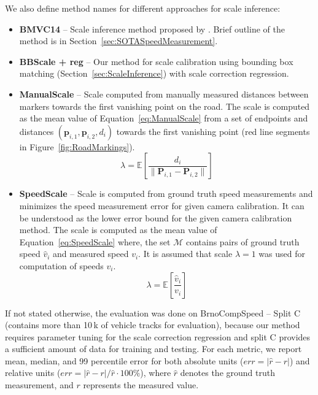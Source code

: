 \documentclass[]{elsarticle}
\newcommand{\gt}[1]{\hat{#1}}
\newcommand{\BMVCScale}{BMVC14}
\newcommand{\BBScaleReg}{BBScale + reg}
\newcommand{\ManualScale}{ManualScale}
\newcommand{\SpeedScale}{SpeedScale}
\begin{document}
We also define method names for different approaches for scale inference:
\begin{itemize}
	\item \textbf{\BMVCScale} -- Scale inference method proposed by \cite{Dubska2014}. Brief outline of the method is in Section~\ref{sec:SOTASpeedMeasurement}.
	\item \textbf{\BBScaleReg} -- Our method for scale calibration using bounding box matching (Section~\ref{sec:ScaleInference}) with scale correction regression.
	\item \textbf{\ManualScale} -- Scale computed from manually measured distances between markers towards the first vanishing point on the road. The scale is computed as the mean value of Equation~\eqref{eq:ManualScale} from a set of endpoints and distances $(\mathbf{p}_{i,1}, \mathbf{p}_{i,2}, d_i)$ towards the first vanishing point (red line segments in Figure~\ref{fig:RoadMarkings}). 
	\begin{equation}
		\lambda = \mathbb{E}\left[ \frac{d_i}{\| \mathbf{P}_{i,1} - \mathbf{P}_{i,2} \|} \right] \label{eq:ManualScale}
	\end{equation}

	\item \textbf{\SpeedScale} -- Scale is computed from ground truth speed measurements and minimizes the speed measurement error for given camera calibration. It can be understood as the lower error bound for the given camera calibration method. The scale is computed as the mean value of Equation~\eqref{eq:SpeedScale} where, the set $\mathcal{M}$ contains pairs of ground truth speed $\gt{v}_i$ and measured speed $v_i$. It is assumed that scale $\lambda = 1$ was used for computation of speeds $v_i$.
	\begin{equation}
	\lambda =  \mathbb{E} \left[ \frac{\gt{v}_i}{v_i} \right] \label{eq:SpeedScale}
	\end{equation}
\end{itemize}

If not stated otherwise, the evaluation was done on BrnoCompSpeed -- Split C (contains more than 10\,k of vehicle tracks for evaluation), because our method requires parameter tuning for the scale correction regression and split C provides a sufficient amount of data for training and testing. For each metric, we report mean, median, and 99 percentile error for both absolute units ($err = |\gt{r} - r|$) and relative units ($err = |\gt{r} - r|/\gt{r} \cdot 100\%$), where $\gt{r}$ denotes the ground truth measurement, and $r$ represents the measured value. 
\end{document}
